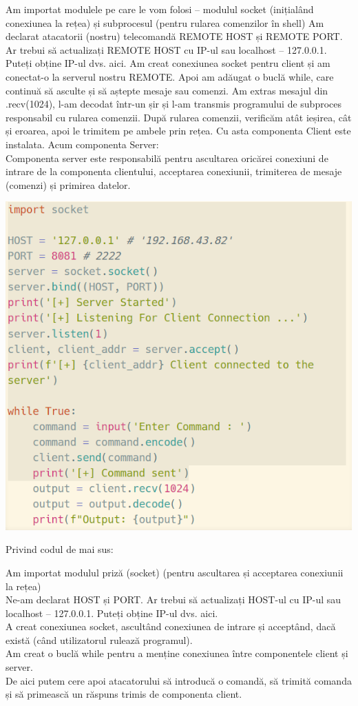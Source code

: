 \documentclass[oneside,20pt]{article}          %
\begin{document}
Am importat modulele pe care le vom folosi – modulul socket (inițialând conexiunea la rețea) și subprocesul (pentru rularea comenzilor în shell)
Am declarat atacatorii (nostru) telecomandă REMOTE HOST și REMOTE PORT. Ar trebui să actualizați REMOTE HOST cu IP-ul sau localhost – 127.0.0.1. Puteți obține IP-ul dvs. aici.
Am creat conexiunea socket pentru client și am conectat-o ​​la serverul nostru REMOTE.
Apoi am adăugat o buclă while, care continuă să asculte și să aștepte mesaje sau comenzi.
Am extras mesajul din .recv(1024), l-am decodat într-un șir și l-am transmis programului de subproces responsabil cu rularea comenzii.
După rularea comenzii, verificăm atât ieșirea, cât și eroarea, apoi le trimitem pe ambele prin rețea.
Cu asta componenta Client este instalata.
Acum componenta Server:\\

Componenta server este responsabilă pentru ascultarea oricărei conexiuni de intrare de la componenta clientului, acceptarea conexiunii, trimiterea de mesaje (comenzi) și primirea datelor.
  \begin{center}
\includegraphics[height=5 cm]{5.png}
\end{center}
Privind codul de mai sus:

Am importat modulul priză (socket) (pentru ascultarea și acceptarea conexiunii la rețea)\\
Ne-am declarat HOST și PORT. Ar trebui să actualizați HOST-ul cu IP-ul sau localhost – 127.0.0.1. Puteți obține IP-ul dvs. aici.\\
A creat conexiunea socket, ascultând conexiunea de intrare și acceptând, dacă există (când utilizatorul rulează programul).\\
Am creat o buclă while pentru a menține conexiunea între componentele client și server.\\
De aici putem cere apoi atacatorului să introducă o comandă, să trimită comanda și să primească un răspuns trimis de componenta client.\\
\end{document}
